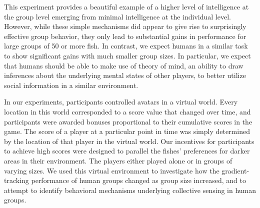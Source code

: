 \documentclass[12pt,letterpaper]{article}
\begin{document}
This experiment provides a beautiful example of a higher level of
intelligence at the group level emerging from minimal intelligence at
the individual level.
However, while these simple mechanisms did appear to give rise to
surprisingly effective group behavior, they only lead to substantial
gains in performance for large groups of 50 or more fish.  In
contrast, we expect humans in a similar task to show significant gains
with much smaller group sizes.  In particular, we expect that humans
should be able to make use of theory of mind, an ability to draw
inferences about the underlying mental states of other players, to
better utilize social information in a similar environment.

In our experiments, participants controlled avatars in a virtual world.  
Every location in this world corresponded to a score value that changed over time, and participants were awarded bonuses proportional to their cumulative scores in the game. 
The score of a player at a particular point in time was simply determined by the location of that player in the virtual world. 
Our incentives for participants to achieve high scores were designed to parallel the fishes' preferences for darker areas in their environment.
The players either played alone or in groups of varying sizes.   
We used this virtual environment to investigate how the gradient-tracking performance of human groups changed as group size increased, and to attempt to identify behavioral mechanisms underlying collective sensing in human groups.
\end{document}
